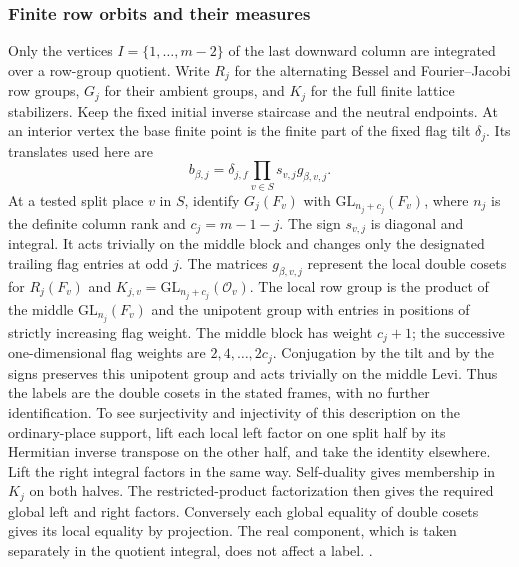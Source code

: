 \subsubsection{Finite row orbits and their measures}
Only the vertices \(I=\{1,\ldots,m-2\}\) of the last downward
column are integrated over a row-group quotient. Write \(R_j\)
for the alternating Bessel and Fourier--Jacobi row groups, \(G_j\)
for their ambient groups, and \(K_j\) for the full finite lattice
stabilizers. Keep the fixed initial inverse staircase and the neutral
endpoints. At an interior vertex the base finite point is the finite
part of the fixed flag tilt \(\delta_j\). Its translates used here
are
\[
 b_{\beta,j}=\delta_{j,f}\prod_{v\in S}
                s_{v,j}g_{\beta,v,j}.
\]
At a tested split place \(v\) in \(S\), identify \(G_j(F_v)\)
with \(\mathrm{GL}_{n_j+c_j}(F_v)\), where \(n_j\) is the
definite column rank and \(c_j=m-1-j\). The sign \(s_{v,j}\)
is diagonal and integral. It acts trivially on the middle block
and changes only the designated trailing flag entries at odd \(j\).
The matrices \(g_{\beta,v,j}\) represent the local double cosets
for \(R_j(F_v)\) and \(K_{j,v}=\mathrm{GL}_{n_j+c_j}(\mathcal O_v)\).
The local row group is the product of the middle
\(\mathrm{GL}_{n_j}(F_v)\) and the unipotent group with entries in
positions of strictly increasing flag weight. The middle block has
weight \(c_j+1\); the successive one-dimensional flag weights are
\(2,4,\ldots,2c_j\). Conjugation by the tilt and by the signs
preserves this unipotent group and acts trivially on the middle
Levi. Thus the labels are the double cosets in the stated frames,
with no further identification. To see surjectivity and injectivity
of this description on the ordinary-place support, lift each local
left factor on one split half by its Hermitian inverse transpose
on the other half, and take the identity elsewhere. Lift the right
integral factors in the same way. Self-duality gives membership in
\(K_j\) on both halves. The restricted-product factorization then
gives the required global left and right factors. Conversely each
global equality of double cosets gives its local equality by
projection. The real component, which is taken separately in the
quotient integral, does not affect a label.
.

